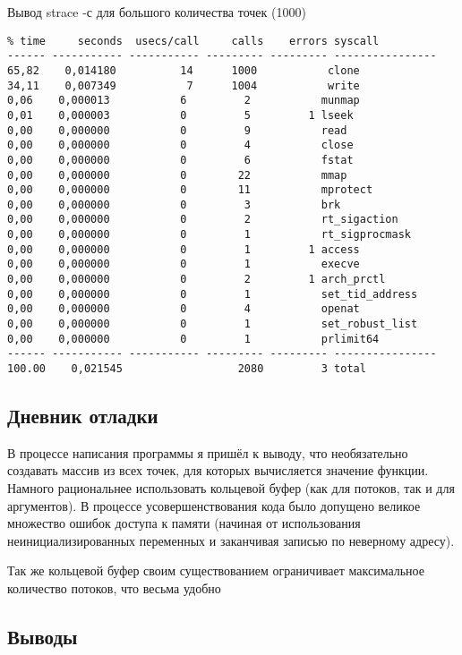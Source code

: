 \documentclass[12pt]{article}
\begin{document}
\noindent Вывод strace -с для большого количества точек (1000)
{ \scriptsize
\begin{lstlisting}
% time     seconds  usecs/call     calls    errors syscall
------ ----------- ----------- --------- --------- ----------------
65,82    0,014180          14      1000           clone
34,11    0,007349           7      1004           write
0,06    0,000013           6         2           munmap
0,01    0,000003           0         5         1 lseek
0,00    0,000000           0         9           read
0,00    0,000000           0         4           close
0,00    0,000000           0         6           fstat
0,00    0,000000           0        22           mmap
0,00    0,000000           0        11           mprotect
0,00    0,000000           0         3           brk
0,00    0,000000           0         2           rt_sigaction
0,00    0,000000           0         1           rt_sigprocmask
0,00    0,000000           0         1         1 access
0,00    0,000000           0         1           execve
0,00    0,000000           0         2         1 arch_prctl
0,00    0,000000           0         1           set_tid_address
0,00    0,000000           0         4           openat
0,00    0,000000           0         1           set_robust_list
0,00    0,000000           0         1           prlimit64
------ ----------- ----------- --------- --------- ----------------
100.00    0,021545                  2080         3 total
\end{lstlisting}}


\subsection*{Дневник отладки}  

В процессе написания программы я пришёл к выводу, что необязательно создавать массив из всех точек, для которых вычисляется значение функции. Намного рациональнее использовать кольцевой буфер (как для потоков, так и для аргументов). В процессе усовершенствования кода было допущено великое множество ошибок доступа к памяти (начиная от использования неинициализированных переменных и заканчивая записью по неверному адресу).

Так же кольцевой буфер своим существованием ограничивает максимальное количество потоков, что весьма удобно


\subsection*{Выводы}
\end{document}
